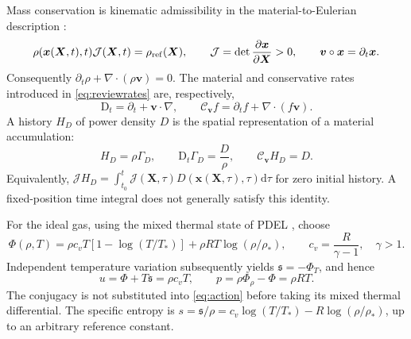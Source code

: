\documentclass[11pt,a4paper]{article}
\theoremstyle{remark}\newtheorem{remark}{Remark}
\numberwithin{equation}{section}
\newcommand{\dd}{\mathrm{d}}
\newcommand{\vv}{\boldsymbol v}
\newcommand{\xx}{\boldsymbol x}
\newcommand{\XX}{\boldsymbol X}
\newcommand{\grad}{\nabla}
\newcommand{\diver}{\nabla\!\cdot}
\newcommand{\Dt}{\mathrm D_t}
\newcommand{\Cv}{\mathcal C_{\vv}}
\newcommand{\st}{\mathfrak s}
\begin{document}
Mass conservation is kinematic admissibility in the material-to-Eulerian description \citep{Newcomb1962,Holm1998,RenEulerian}:
\begin{equation}
\rho(\xx(\XX,t),t)\mathcal J(\XX,t)=\rho_{\rm ref}(\XX),\qquad
\mathcal J=\det\frac{\partial\xx}{\partial\XX}>0,
\qquad \vv\circ\xx=\partial_t\xx.
\label{eq:kinematics}
\end{equation}
Consequently $\partial_t\rho+\diver(\rho\vv)=0$. The material and conservative rates introduced in \eqref{eq:reviewrates} are, respectively,
\begin{equation}
\Dt=\partial_t+\vv\cdot\grad,\qquad
\Cv f=\partial_tf+\diver(f\vv).
\label{eq:rates}
\end{equation}
A history $H_D$ of power density $D$ is the spatial representation of a material accumulation:
\begin{equation}
H_D=\rho\Gamma_D,\qquad
\Dt\Gamma_D=\frac D\rho,\qquad
\Cv H_D=D.
\label{eq:historytransport}
\end{equation}
Equivalently, $\mathcal JH_D=\int_{t_0}^{t}\mathcal J(\XX,\tau)D(\xx(\XX,\tau),\tau)\dd\tau$ for zero initial history. A fixed-position time integral does not generally satisfy this identity.

For the ideal gas, using the mixed thermal state of PDEL \citep{RenEntropy,RenEulerian}, choose
\begin{equation}
\Phi(\rho,T)=\rho c_vT[1-\log(T/T_*)]
+\rho RT\log(\rho/\rho_*),\qquad
c_v=\frac{R}{\gamma-1},\quad \gamma>1.
\label{eq:freeenergy}
\end{equation}
Independent temperature variation subsequently yields $\st=-\Phi_T$, and hence
\begin{equation}
u=\Phi+T\st=\rho c_vT,\qquad
p=\rho\Phi_\rho-\Phi=\rho RT.
\label{eq:eos}
\end{equation}
The conjugacy is not substituted into \eqref{eq:action} before taking its mixed thermal differential. The specific entropy is $s=\st/\rho=c_v\log(T/T_*)-R\log(\rho/\rho_*)$, up to an arbitrary reference constant.
\end{document}
